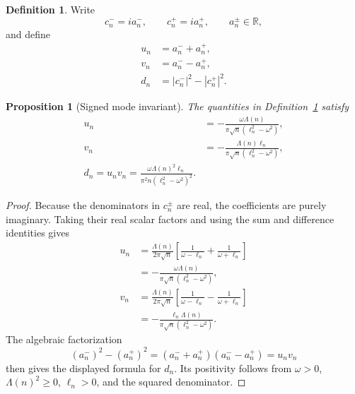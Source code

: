 \documentclass[11pt]{amsart}
\numberwithin{equation}{section}
\theoremstyle{plain}
\newtheorem{proposition}[theorem]{Proposition}
\theoremstyle{definition}
\newtheorem{definition}[theorem]{Definition}
\theoremstyle{remark}
\newcommand{\1}{\mathbf{1}}
\begin{document}
\begin{definition}
\label{def:u_v_d}
Write
\begin{equation}
c_n^-=ia_n^-,
\qquad
c_n^+=ia_n^+,
\qquad
a_n^\pm\in\mathbb R,
\label{eq:a_pm_definition}
\end{equation}
and define
\begin{align}
u_n
&=
a_n^-+a_n^+,
\label{eq:un_definition}
\\
v_n
&=
a_n^--a_n^+,
\label{eq:vn_definition}
\\
d_n
&=
|c_n^-|^2-|c_n^+|^2.
\label{eq:dn_definition}
\end{align}
\end{definition}

\begin{proposition}[Signed mode invariant]
\label{prop:signed_mode_invariant}
The quantities in Definition~\ref{def:u_v_d} satisfy
\begin{align}
u_n
&=
-\frac{\omega\Lambda(n)}
{\pi\sqrt n(\ell_n^2-\omega^2)},
\label{eq:un_formula}
\\
v_n
&=
-\frac{\Lambda(n)\ell_n}
{\pi\sqrt n(\ell_n^2-\omega^2)},
\label{eq:vn_formula}
\\
\boxed{
d_n=u_nv_n
=
\frac{\omega\Lambda(n)^2\ell_n}
{\pi^2n(\ell_n^2-\omega^2)^2}.
}
\label{eq:dn_formula}
\end{align}
\end{proposition}

\begin{proof}
Because the denominators in \(c_n^\pm\) are real, the coefficients are
purely imaginary.  Taking their real scalar factors and using the sum and
difference identities gives
\begin{align}
u_n
&=
\frac{\Lambda(n)}{2\pi\sqrt n}
\left[
\frac1{\omega-\ell_n}+\frac1{\omega+\ell_n}
\right]
\label{eq:un_proof_one}
\\
&=
-\frac{\omega\Lambda(n)}
{\pi\sqrt n(\ell_n^2-\omega^2)},
\label{eq:un_proof_two}
\\
v_n
&=
\frac{\Lambda(n)}{2\pi\sqrt n}
\left[
\frac1{\omega-\ell_n}-\frac1{\omega+\ell_n}
\right]
\label{eq:vn_proof_one}
\\
&=
-\frac{\ell_n\Lambda(n)}
{\pi\sqrt n(\ell_n^2-\omega^2)}.
\label{eq:vn_proof_two}
\end{align}
The algebraic factorization
\begin{equation}
(a_n^-)^2-(a_n^+)^2
=
(a_n^-+a_n^+)(a_n^--a_n^+)
=u_nv_n
\label{eq:dn_difference_squares}
\end{equation}
then gives the displayed formula for \(d_n\).  Its positivity follows
from \(\omega>0\), \(\Lambda(n)^2\geq0\), \(\ell_n>0\), and the squared
denominator.
\end{proof}
\end{document}
